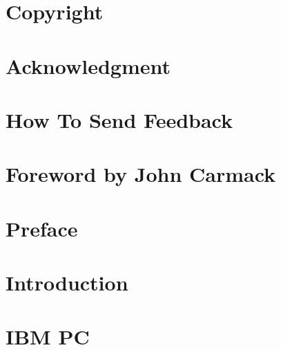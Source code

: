 \documentclass{book}
\begin{document}
   
    \blankpage
    \blankpage
    
    
        
    \addtolength{\cftsecnumwidth}{10pt}
    
    \cleardoublepage %



    \chapter*{Copyright}
           

    \chapter*{Acknowledgment}
      

    \chapter*{How To Send Feedback}
      
  

    \chapter*{Foreword by John Carmack}
      

    \cleardoublepage %
    
    \setcounter{secnumdepth}{3} %
    
    \tableofcontents
    
    \pagebreak

     \chapter*{Preface}
       

    \chapter{Introduction}
      

   
      \chapter{IBM PC}
        
        
        
        
        
        
            
\end{document}
